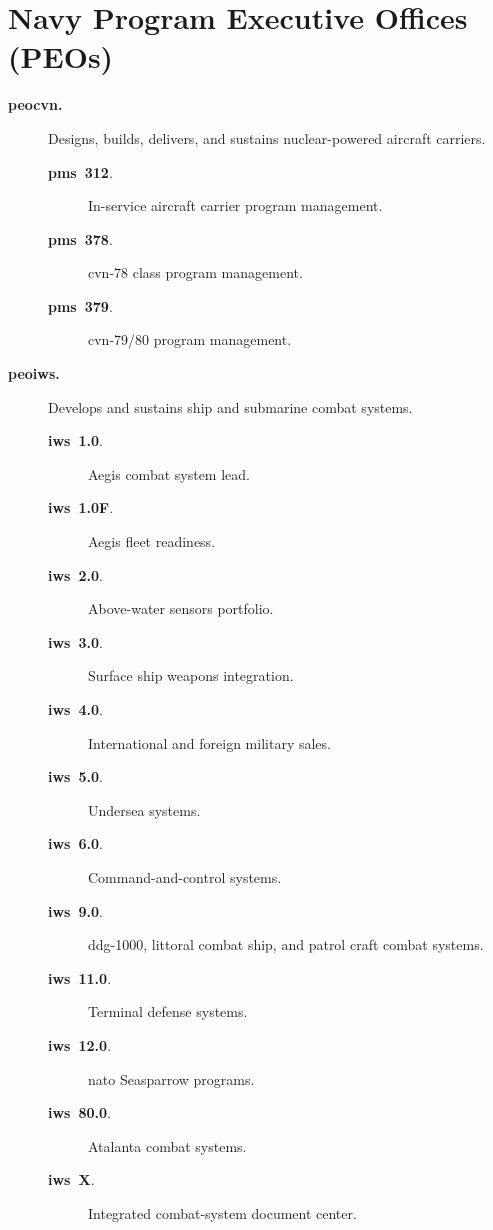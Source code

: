 \documentclass[../main.tex]{subfiles}
\begin{document}
  \section{Navy Program Executive Offices (PEOs)}
  \begin{description}
    \item[\textbf{\ac{peocvn}.}] Designs, builds, delivers, and sustains nuclear-powered aircraft carriers. 
          \begin{description}
            \item[\textbf{\ac{pms}~312}.] In-service aircraft carrier program management.
            \item[\textbf{\ac{pms}~378}.] \ac{cvn}-78 class program management.
            \item[\textbf{\ac{pms}~379}.] \ac{cvn}-79/80 program management.
          \end{description}
    \item[\textbf{\ac{peoiws}.}] Develops and sustains ship and submarine combat systems. 
          \begin{description}
            \item[\textbf{\ac{iws}~1.0}.] Aegis combat system lead.
            \item[\textbf{\ac{iws}~1.0F}.] Aegis fleet readiness.
            \item[\textbf{\ac{iws}~2.0}.] Above-water sensors portfolio.
            \item[\textbf{\ac{iws}~3.0}.] Surface ship weapons integration.
            \item[\textbf{\ac{iws}~4.0}.] International and foreign military sales.
            \item[\textbf{\ac{iws}~5.0}.] Undersea systems.
            \item[\textbf{\ac{iws}~6.0}.] Command-and-control systems.
            \item[\textbf{\ac{iws}~9.0}.] \ac{ddg}-1000, littoral combat ship, and patrol craft combat systems.
            \item[\textbf{\ac{iws}~11.0}.] Terminal defense systems.
            \item[\textbf{\ac{iws}~12.0}.] \ac{nato} Seasparrow programs.
            \item[\textbf{\ac{iws}~80.0}.] Atalanta combat systems.
            \item[\textbf{\ac{iws}~X}.] Integrated combat-system document center.

\end{description}
\end{description}
\end{document}

